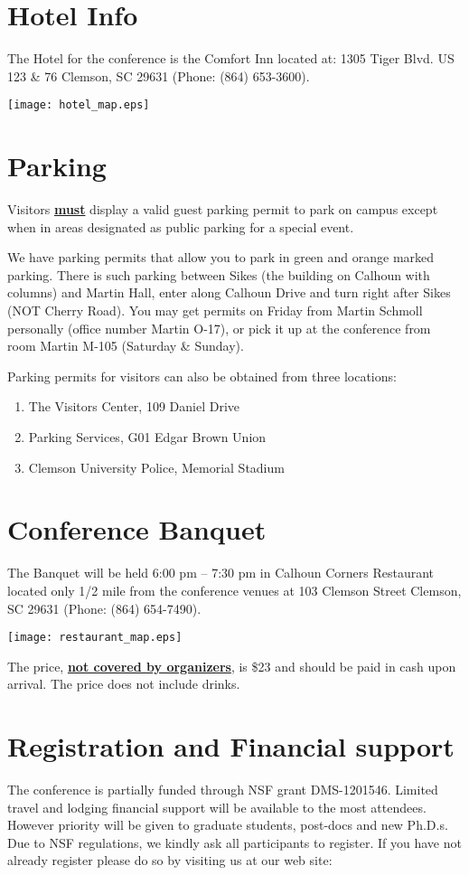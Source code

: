 \documentclass[10pt,foldmark,notumble]{leaflet}
\begin{document}
\section{Hotel Info}
The Hotel for the conference is the Comfort Inn located at:
1305 Tiger Blvd.
US 123 \& 76
Clemson, SC 29631
(Phone: (864) 653-3600).

\texttt{[image: hotel\_map.eps]}
\section{Parking}
Visitors \underline{\bf must} display a valid guest parking permit to
park on campus except when in areas designated as public parking for a
special event.


We have parking permits that allow you to park in green and orange
marked parking. There is such parking between Sikes (the building on
Calhoun with columns) and Martin Hall, enter along Calhoun Drive and
turn right after Sikes (NOT Cherry Road). You may get permits on Friday
from Martin Schmoll personally (office number Martin O-17), or pick it
up at the conference from room Martin M-105 (Saturday \& Sunday).


Parking permits for visitors can also be obtained from three locations:
\begin{enumerate}
\item The Visitors Center, 109 Daniel Drive
\item Parking Services, G01 Edgar Brown Union
\item Clemson University Police, Memorial
Stadium
\end{enumerate}
\section{Conference Banquet}
The Banquet will be held 6:00 pm -- 7:30 pm in Calhoun Corners
Restaurant located only 1/2 mile from the conference venues at
103 Clemson Street
Clemson, SC 29631
(Phone: (864) 654-7490).

\texttt{[image: restaurant\_map.eps]}

The price, \underline{\bf not covered by organizers}, is \$23 and should
be paid in cash upon arrival. The price does not include drinks.



\section{Registration and Financial support} The
conference is partially funded through NSF grant DMS-1201546.  Limited
travel and lodging financial support will be available to the most
attendees. However priority will be given to graduate students,
post-docs and new Ph.D.s. Due to NSF regulations, we kindly ask all
participants to register. If you have not already register please do so
by visiting us at our web site:
\end{document}

